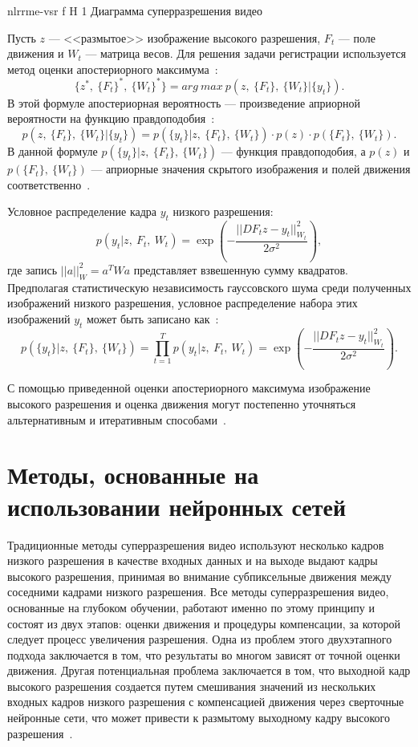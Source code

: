 \documentclass{bmstu}
\begin{document}
    {nlrrme-vsr}
    {f}
    {H}
    {1\textwidth}
    {Диаграмма суперразрешения видео~\cite{Jian2014}}

Пусть $z$ --- <<размытое>> изображение высокого разрешения, $F_t$ --- поле движения и $W_t$ --- матрица весов. 
Для решения задачи регистрации используется метод оценки апостериорного максимума~\cite{Jian2014}:
\begin{equation}
\{z^{*},~\{F_t\}^{*},~\{W_t\}^{*}\} = arg~max~p(z,~\{F_t\},~\{W_t\}|\{y_t\}).
\end{equation}
В этой формуле апостериорная вероятность --- произведение априорной вероятности на функцию правдоподобия~\cite{Jian2014}:
\begin{equation}
p(z,~\{F_t\},~\{W_t\}|\{y_t\}) = p(\{y_t\}|z,~\{F_t\},~\{W_t\}) \cdot p(z) \cdot p(\{F_t\},~\{W_t\}).
\end{equation}
В данной формуле $p(\{y_t\}|z,~\{F_t\},~\{W_t\})$ --- функция правдоподобия, а $p(z)$ и $p(\{F_t\},~\{W_t\})$ --- априорные значения скрытого изображения и полей движения соответственно~\cite{Jian2014}.

Условное распределение кадра $y_t$ низкого разрешения:
\begin{equation}
p(y_t|z,~F_t,~W_t) = \exp(-\frac{||DF_{t}z - y_t||_{W_t}^{2}}{2 \sigma^2}),
\end{equation}
где запись $||a||_{W}^2 = a^{T}Wa$ представляет взвешенную сумму квадратов. 
Предполагая статистическую независимость гауссовского шума среди полученных изображений низкого разрешения, условное распределение набора этих изображений $y_t$ может быть записано как~\cite{Jian2014}:
\begin{equation}
p(\{y_t\}|z,~\{F_t\},~\{W_t\}) = \prod_{t = 1}^{T} p(y_t|z,~F_t,~W_t) = \exp(-\frac{||DF_{t}z - y_t||_{W_t}^{2}}{2 \sigma^2}).
\end{equation}

С помощью приведенной оценки апостериорного максимума изображение высокого разрешения и оценка движения могут постепенно уточняться альтернативным и итеративным способами~\cite{Jian2014}.

\section{Методы, основанные на использовании нейронных сетей}

Традиционные методы суперразрешения видео используют несколько кадров низкого разрешения в качестве входных данных и на выходе выдают кадры высокого разрешения, принимая во внимание субпиксельные движения между соседними кадрами низкого разрешения. 
Все методы суперразрешения видео, основанные на глубоком обучении, работают именно по этому принципу и состоят из двух этапов: оценки движения и процедуры компенсации, за которой следует процесс увеличения разрешения. 
Одна из проблем этого двухэтапного подхода заключается в том, что результаты во многом зависят от точной оценки движения. 
Другая потенциальная проблема заключается в том, что выходной кадр высокого разрешения создается путем смешивания значений из нескольких входных кадров низкого разрешения с компенсацией движения через сверточные нейронные сети, что может привести к размытому выходному кадру высокого разрешения~\cite{Younghyun2018}.
\end{document}
